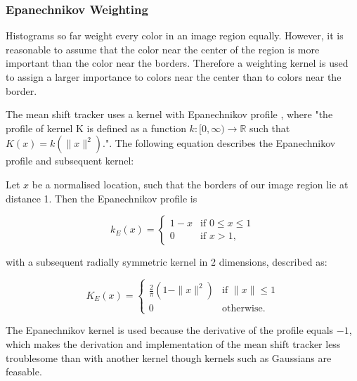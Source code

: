 \documentclass[a4paper,11pt]{article}
\begin{document}
\subsubsection{Epanechnikov Weighting}

Histograms so far weight every color in an image region equally. However, it is reasonable to assume that the color near the center of the region is more important than the color near the borders. Therefore a weighting kernel is used to assign a larger importance to colors near the center than to colors near the border.



The mean shift tracker uses a kernel with Epanechnikov profile \cite{mean_shift_epan}, where "the profile of kernel K is defined as a function $k:[0,\infty)\rightarrow\mathbb{R}$ such that $K(x)=k(\|x\|^2)$."\cite{mean_shift}. The following equation describes the Epanechnikov profile and subsequent kernel: 



Let $x$ be a normalised location, such that the borders of our image region lie at distance 1. Then the Epanechnikov profile is



\begin{equation}
\label{eq:epanechnikov_profile}
k_E(x) = \left\{ \begin{array}{cl}
  1-x & \textrm{if } 0 \leq x \leq 1\\
  0 & \textrm{if }  x > 1 ,\end{array}\right.
\end{equation}

with a subsequent radially symmetric kernel in 2 dimensions, described as:

\begin{equation}
\label{eq:epanechnikov_kernel1}
K_E(x) = \left\{ \begin{array}{cl}
  \frac{2}{\pi} (1-\|x\|^2) & \textrm{if } \|x\| \leq 1 \\
  0 & \textrm{otherwise.} \end{array}\right.
\end{equation}





The Epanechnikov kernel is used because the derivative of the profile equals $-1$, which makes the derivation and implementation of the mean shift tracker less troublesome than with another kernel though kernels such as Gaussians are feasable.
\end{document}
